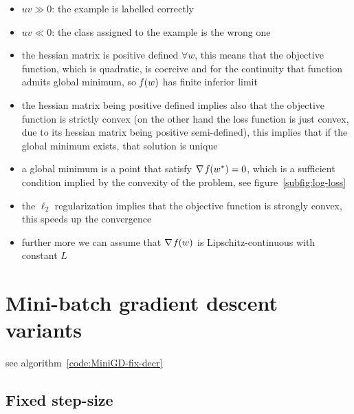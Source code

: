 \cleardoublepage

\begin{itemize}
\item $uv\gg0$: the example is labelled correctly
\item $uv\ll0$: the class assigned to the example is the wrong one
\end{itemize}

\begin{itemize}
\item the hessian matrix is positive defined $\forall w$, this means that the objective function, which is quadratic, is coercive and for the continuity that function admits global minimum, so $\operatorname*{\mathit{f}}(w)$ has finite inferior limit
\item the hessian matrix being positive defined implies also that the objective function is strictly convex (on the other hand the loss function is just convex, due to its hessian matrix being positive semi-defined), this implies that if the global minimum exists, that solution is unique
\item a global minimum is a point that satisfy $\nabla\operatorname*{\mathit{f}}(w^\ast)=0$, which is a sufficient condition implied by the convexity of the problem, see figure~\vref{subfig:log-loss}
\item the $\ell_2$ regularization implies that the objective function is strongly convex, this speeds up the convergence
\item further more we can assume that $\nabla\operatorname*{\mathit{f}}(w)$ is Lipschitz-continuous with constant $L$
\end{itemize}


\cleardoublepage
\section{Mini-batch gradient descent variants}

see algorithm~\vref{code:MiniGD-fix-decr}

\subsection{Fixed step-size}


